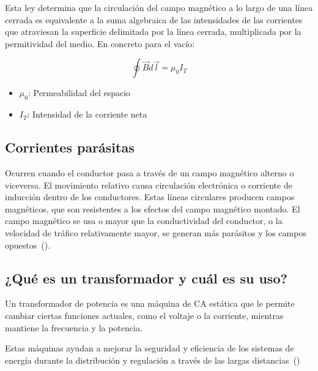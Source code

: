 \documentclass[twocolumn, 12pt]{article}
\begin{document}
Esta ley determina que la circulación del campo magnético a
lo largo de una línea cerrada es equivalente a la suma
algebraica de las intensidades de las corrientes que
atraviesan la superficie delimitada por la línea cerrada,
multiplicada por la permitividad del medio. En concreto
para el vacío:

{\Large
\begin{equation}
	\oint \vec{B} d \vec{l} = \mu_{\scriptscriptstyle 0} I_{\scriptscriptstyle T}
\end{equation}
}

\begin{itemize}[label=$\triangleright$]
	\item {\Large $\mu_0$}: Permeabilidad del espacio
	\item {\Large $I_T$}: Intensidad de la corriente neta
\end{itemize}

\nocite{FenomenosElectromagneticos}

\subsection*{Corrientes parásitas}

Ocurren cuando el conductor pasa a través de un campo
magnético alterno o viceversa. El movimiento relativo causa
circulación electrónica o corriente de inducción dentro de
los conductores. Estas líneas circulares producen campos
magnéticos, que son resistentes a los efectos del campo
magnético montado. El campo magnético se usa o mayor que la
conductividad del conductor, o la velocidad de tráfico
relativamente mayor, se generan más parásitos y los campos
opuestos~(\cite{FenomenosElectromagneticos}).

\subsection*{¿Qué es un transformador y cuál es su uso?}

Un transformador de potencia es una máquina de CA estática
que le permite cambiar ciertas funciones actuales, como el
voltaje o la corriente, mientras mantiene la frecuencia y
la potencia.

Estas máquinas ayudan a mejorar la seguridad y eficiencia
de los sistemas de energía durante la distribución y
regulación a través de las largas
distancias~(\cite{FenomenosElectromagneticos})
\end{document}
